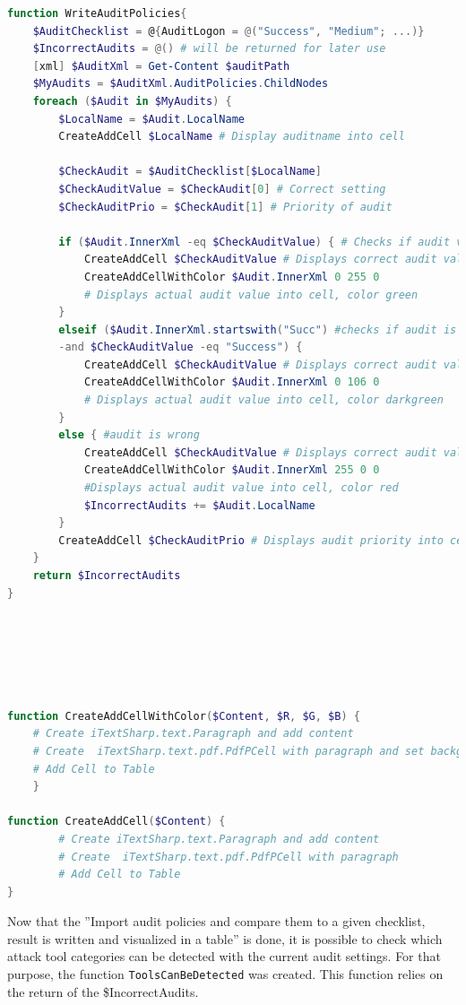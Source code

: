 \begin{lstlisting}[caption=Functions WriteAuditPolicies \& CreateAddCellWithColor \& CreateAddCell, language=PowerShell]
function WriteAuditPolicies{
    $AuditChecklist = @{AuditLogon = @("Success", "Medium"; ...)}
    $IncorrectAudits = @() # will be returned for later use
    [xml] $AuditXml = Get-Content $auditPath
    $MyAudits = $AuditXml.AuditPolicies.ChildNodes
    foreach ($Audit in $MyAudits) {
        $LocalName = $Audit.LocalName
        CreateAddCell $LocalName # Display auditname into cell

        $CheckAudit = $AuditChecklist[$LocalName]
        $CheckAuditValue = $CheckAudit[0] # Correct setting
        $CheckAuditPrio = $CheckAudit[1] # Priority of audit

        if ($Audit.InnerXml -eq $CheckAuditValue) { # Checks if audit values are equal
            CreateAddCell $CheckAuditValue # Displays correct audit value
            CreateAddCellWithColor $Audit.InnerXml 0 255 0 
            # Displays actual audit value into cell, color green  
        }
        elseif ($Audit.InnerXml.startswith("Succ") #checks if audit is ''overpowered''
        -and $CheckAuditValue -eq "Success") {
            CreateAddCell $CheckAuditValue # Displays correct audit value
            CreateAddCellWithColor $Audit.InnerXml 0 106 0 
            # Displays actual audit value into cell, color darkgreen
        }
        else { #audit is wrong
            CreateAddCell $CheckAuditValue # Displays correct audit value
            CreateAddCellWithColor $Audit.InnerXml 255 0 0 
            #Displays actual audit value into cell, color red
            $IncorrectAudits += $Audit.LocalName
        }
        CreateAddCell $CheckAuditPrio # Displays audit priority into cell
    }
    return $IncorrectAudits
}






function CreateAddCellWithColor($Content, $R, $G, $B) {
    # Create iTextSharp.text.Paragraph and add content
    # Create  iTextSharp.text.pdf.PdfPCell with paragraph and set backgroundcolor $R $G $B
    # Add Cell to Table
    }

function CreateAddCell($Content) {
        # Create iTextSharp.text.Paragraph and add content
        # Create  iTextSharp.text.pdf.PdfPCell with paragraph
        # Add Cell to Table
}
\end{lstlisting}
Now that the ''Import audit policies and compare them to a given checklist, result is written and visualized in a table'' is done, it is possible to check which attack tool categories can be detected with the current audit settings. For that purpose, the function \lstinline|ToolsCanBeDetected| was created. This function relies on the return of the \$IncorrectAudits.
